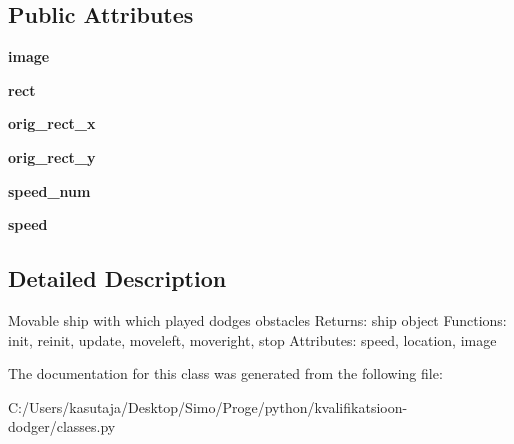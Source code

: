 \subsection*{Public Attributes}
\begin{DoxyCompactItemize}
\item 
\hypertarget{classclasses_1_1_ship_aaa521a3e5eb9c1226fbe86fe0665561a}{}{\bfseries image}\label{classclasses_1_1_ship_aaa521a3e5eb9c1226fbe86fe0665561a}

\item 
\hypertarget{classclasses_1_1_ship_ab95eccff4a54cc2e6589a8231f81dbc9}{}{\bfseries rect}\label{classclasses_1_1_ship_ab95eccff4a54cc2e6589a8231f81dbc9}

\item 
\hypertarget{classclasses_1_1_ship_ab76b7616c30c5e11956259958fc7f8f0}{}{\bfseries orig\+\_\+rect\+\_\+x}\label{classclasses_1_1_ship_ab76b7616c30c5e11956259958fc7f8f0}

\item 
\hypertarget{classclasses_1_1_ship_a645f11e76bb14435a6c64128e0719dba}{}{\bfseries orig\+\_\+rect\+\_\+y}\label{classclasses_1_1_ship_a645f11e76bb14435a6c64128e0719dba}

\item 
\hypertarget{classclasses_1_1_ship_a05c797390e75307b7c1c149de9d76ce7}{}{\bfseries speed\+\_\+num}\label{classclasses_1_1_ship_a05c797390e75307b7c1c149de9d76ce7}

\item 
\hypertarget{classclasses_1_1_ship_ab652b59eb8c66b74f5f0d36e22637414}{}{\bfseries speed}\label{classclasses_1_1_ship_ab652b59eb8c66b74f5f0d36e22637414}

\end{DoxyCompactItemize}


\subsection{Detailed Description}
\begin{DoxyVerb}Movable ship with which played dodges obstacles
Returns: ship object
Functions: init, reinit, update, moveleft, moveright, stop
Attributes: speed, location, image\end{DoxyVerb}
 

The documentation for this class was generated from the following file\+:\begin{DoxyCompactItemize}
\item 
C\+:/\+Users/kasutaja/\+Desktop/\+Simo/\+Proge/python/kvalifikatsioon-\/dodger/classes.\+py\end{DoxyCompactItemize}
